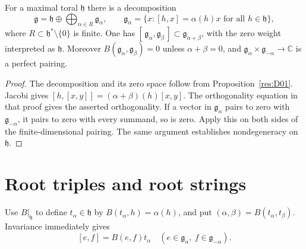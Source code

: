 \begin{proposition}\label{res:D02}
For a maximal toral \(\mathfrak h\) there is a decomposition
\[
 \mathfrak g=\mathfrak h\oplus
       \bigoplus_{\alpha\in R}\mathfrak g_\alpha,\qquad
 \mathfrak g_\alpha=\{x:[h,x]=\alpha(h)x\text{ for all }h\in\mathfrak h\},
\]
where \(R\subset\mathfrak h^*\setminus\{0\}\) is finite.
One has
\([\,\mathfrak g_\alpha,\mathfrak g_\beta\,]\subset
\mathfrak g_{\alpha+\beta}\), with the zero weight interpreted as
\(\mathfrak h\). Moreover \(B(\mathfrak g_\alpha,\mathfrak g_\beta)=0\)
unless \(\alpha+\beta=0\), and
\(\mathfrak g_\alpha\times\mathfrak g_{-\alpha}\to\mathbb C\)
is a perfect pairing.
\end{proposition}
\begin{proof}
The decomposition and its zero space follow from
Proposition~\ref{res:D01}. Jacobi gives
\([h,[x,y]]=(\alpha+\beta)(h)[x,y]\).
The orthogonality equation in that proof gives the asserted
orthogonality. If a vector in \(\mathfrak g_\alpha\) pairs to zero
with \(\mathfrak g_{-\alpha}\), it pairs to zero with every summand,
so is zero. Apply this on both sides of the finite-dimensional pairing.
The same argument establishes nondegeneracy on \(\mathfrak h\).
\end{proof}

\section{Root triples and root strings}

Use \(B|_{\mathfrak h}\) to define \(t_\alpha\in\mathfrak h\) by
\(B(t_\alpha,h)=\alpha(h)\), and put
\((\alpha,\beta)=B(t_\alpha,t_\beta)\). Invariance immediately gives
\[
 [e,f]=B(e,f)t_\alpha
 \quad(e\in\mathfrak g_\alpha,\ f\in\mathfrak g_{-\alpha}).
 \tag{4.1}\label{eq:opposite-bracket}
\]

